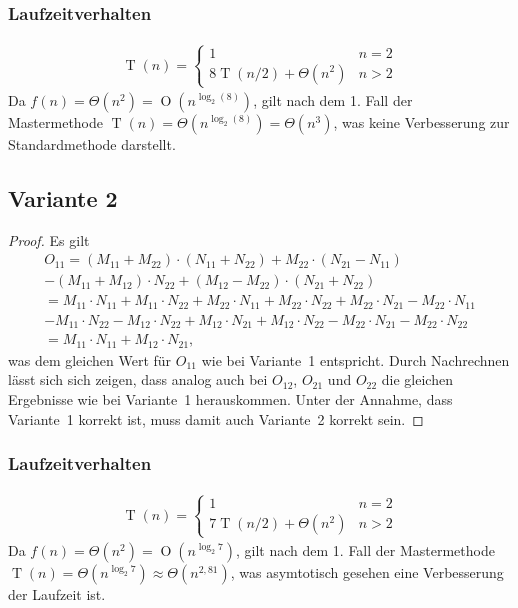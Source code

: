 \documentclass[a4paper]{article}
\newcommand{\BigO}{\operatorname{O}}
\newcommand{\T}{\operatorname{T}}
\begin{document}
    \subsubsection*{Laufzeitverhalten}
    \begin{align*}
        \T(n) =
        \begin{cases}
            1 & n = 2 \\
            8\T(n / 2) + \Theta(n^2) & n > 2
        \end{cases}
    \end{align*}
    Da $f(n) = \Theta(n^2) = \BigO(n^{\log_2(8)})$, gilt nach dem 1. Fall der Mastermethode $\T(n) = \Theta(n^{\log_2(8)}) = \Theta(n^3)$, was keine Verbesserung zur {\glqq}Standardmethode{\grqq} darstellt.

    \subsection*{Variante 2}
    \label{subsec:variante2}
    \begin{proof}
        Es gilt
        \begin{multline*}
            O_{11} = (M_{11}+M_{22})\cdot(N_{11}+N_{22}) + M_{22}\cdot(N_{21}-N_{11}) \\
            - (M_{11} + M_{12}) \cdot N_{22} + (M_{12}-M_{22})\cdot(N_{21}+N_{22}) \\
            = M_{11}\cdot N_{11} + M_{11}\cdot N_{22} + M_{22}\cdot N_{11} + M_{22}\cdot N_{22} + M_{22}\cdot N_{21} - M_{22}\cdot N_{11} \\
            - M_{11}\cdot N_{22} - M_{12}\cdot N_{22} + M_{12}\cdot N_{21} + M_{12}\cdot N_{22} - M_{22}\cdot N_{21} - M_{22}\cdot N_{22} \\
            = M_{11} \cdot N_{11} + M_{12} \cdot N_{21}
            \text{,}
        \end{multline*}
        was dem gleichen Wert für $O_{11}$ wie bei Variante~1 entspricht. Durch Nachrechnen lässt sich sich zeigen, dass analog auch bei $O_{12}$, $O_{21}$ und $O_{22}$ die gleichen Ergebnisse wie bei Variante~1 herauskommen.
        Unter der Annahme, dass Variante~1 korrekt ist, muss damit auch Variante~2 korrekt sein.
    \end{proof}

    \subsubsection*{Laufzeitverhalten}
    \begin{align*}
        \T(n) =
        \begin{cases}
            1 & n = 2 \\
            7\T(n / 2) + \Theta(n^2) & n > 2
        \end{cases}
    \end{align*}
    Da $f(n) = \Theta(n^2) = \BigO(n^{\log_{2}{7}})$, gilt nach dem 1. Fall der Mastermethode $\T(n) = \Theta(n^{\log_2{7}}) \approx \Theta(n^{2{,}81})$, was asymtotisch gesehen eine Verbesserung der Laufzeit ist.
\end{document}
